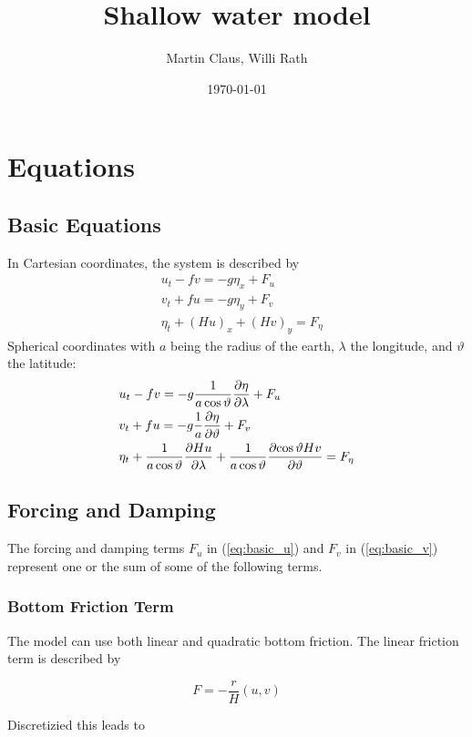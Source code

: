 \documentclass[a4paper]{article}
\title{Shallow water model}
\author{Martin Claus, Willi Rath}
\date{\today}
\begin{document}
\maketitle


\section{Equations}
\subsection{Basic Equations}
In Cartesian coordinates, the system is described by
\begin{align}
  \label{eq:basic_u}
  & u_t - fv = -g \eta_x + F_u \\
  \label{eq:basic_v}
  & v_t + fu = -g \eta_y + F_v \\
  \label{eq:basic_eta}
  & \eta_t + (Hu)_x + (Hv)_y = F_\eta
\end{align}
Spherical coordinates with $a$ being the radius of the earth, $\lambda$ the 
longitude, and $\vartheta$ the latitude:
\begin{align}
  & u_t - fv = -g \frac{1}{a\cos\vartheta}\frac{\partial {\eta}}{\partial {\lambda}} + F_u \\
  & v_t + fu = -g \frac{1}{a}\frac{\partial {\eta}}{\partial {\vartheta}} + F_v \\
  & \eta_t + \frac{1}{a\cos\vartheta}\frac{\partial {Hu}}{\partial {\lambda}} + \frac{1}{a\cos\vartheta}\frac{\partial {\cos\vartheta Hv}}{\partial {\vartheta}} = F_\eta
\end{align}
\subsection{Forcing and Damping}
The forcing and damping terms $F_u$ in (\ref{eq:basic_u}) and $F_v$ in (\ref{eq:basic_v}) represent one or the sum of some of the following terms.
\subsubsection{Bottom Friction Term}

The model can use both linear and quadratic bottom friction.
The linear friction term is described by

\begin{equation}
 F = -\frac rH (u,v)
\end{equation}

Discretizied this leads to
\end{document}
